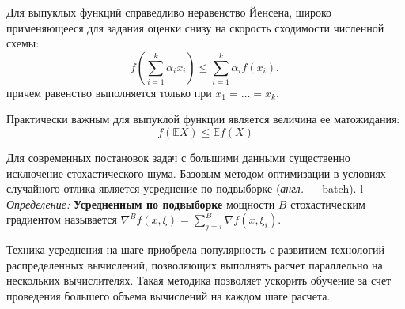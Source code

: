 Для выпуклых функций справедливо неравенство Йенсена, широко применяющееся для задания оценки снизу на скорость 
сходимости численной схемы:
\begin{equation}
    f \left( \sum_{i=1}^k \alpha_i x_i \right) \le \sum_{i=1}^k \alpha_i f(x_i),
\end{equation}
причем равенство выполняется только при $x_1 = \dots =x_k$.

Практически важным для выпуклой функции является величина ее матожидания:
\begin{equation}
    f(\mathbb{E} X) \le \mathbb{E} f(X)
\end{equation}

Для современных постановок задач с большими данными существенно исключение стохастического шума. Базовым методом
оптимизации в условиях случайного отлика является усреднение по подвыборке (\textit{англ.} --- batch). 
l
\textit{Определение:} \textbf{Усредненным по подвыборке} мощности $B$ стохастическим градиентом называется 
$\nabla^B f(x,\xi) = \sum_{j=i}^B \nabla f(x,\xi_i)$.

Техника усреднения на шаге приобрела популярность с развитием технологий распределенных вычислений, позволяющих выполнять
расчет параллельно на нескольких вычислителях. Такая методика позволяет ускорить обучение за счет 
проведения большего объема вычислений на каждом шаге расчета.



